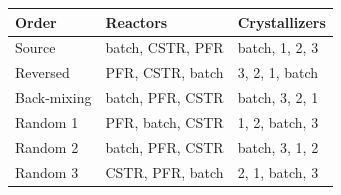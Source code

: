 \begin{tabular}{@{}lll@{}}\toprule
Order & Reactors & Crystallizers\\\midrule
Source & batch, CSTR, PFR & batch, 1, 2, 3 \\
Reversed & PFR, CSTR, batch & 3, 2, 1, batch \\
Back-mixing & batch, PFR, CSTR & batch, 3, 2, 1 \\
Random 1 & PFR, batch, CSTR & 1, 2, batch, 3 \\
Random 2 & batch, PFR, CSTR & batch, 3, 1, 2 \\
Random 3 & CSTR, PFR, batch & 2, 1, batch, 3 \\
\bottomrule\end{tabular}
